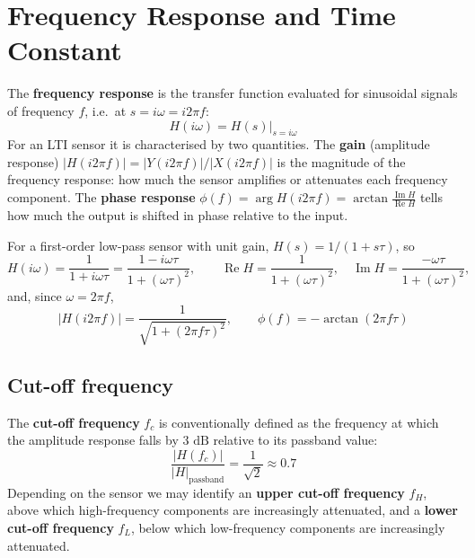 \documentclass[letterpaper,11pt,leqno]{book}
\begin{document}
\section{Frequency Response and Time Constant}
\label{sec:frequency_response}

The \textbf{frequency response} is the transfer function evaluated for sinusoidal signals of frequency $f$, i.e.\ at $s = i\omega = i2\pi f$:
\begin{equation}
\boxed{H(i\omega) = H(s)\big|_{s = i\omega}}
\label{eq:freq_resp_sub}
\end{equation}
For an LTI sensor it is characterised by two quantities. The \textbf{gain} (amplitude response) $|H(i2\pi f)| = |Y(i2\pi f)|/|X(i2\pi f)|$ is the magnitude of the frequency response: how much the sensor amplifies or attenuates each frequency component. The \textbf{phase response} $\phi(f) = \arg H(i2\pi f) = \arctan\frac{\operatorname{Im}H}{\operatorname{Re}H}$ tells how much the output is shifted in phase relative to the input.

For a first-order low-pass sensor with unit gain, $H(s) = 1/(1 + s\tau)$, so
\begin{equation}
H(i\omega) = \frac{1}{1 + i\omega\tau} = \frac{1 - i\omega\tau}{1 + (\omega\tau)^2}, \qquad \operatorname{Re}H = \frac{1}{1 + (\omega\tau)^2}, \quad \operatorname{Im}H = \frac{-\omega\tau}{1 + (\omega\tau)^2},
\label{eq:freq_resp_first_order_complex}
\end{equation}
and, since $\omega = 2\pi f$,
\begin{equation}
\boxed{|H(i2\pi f)| = \frac{1}{\sqrt{1 + (2\pi f\tau)^2}}, \qquad \phi(f) = -\arctan(2\pi f\tau)}
\label{eq:magnitude_and_phase_first_order}
\end{equation}

\subsection{Cut-off frequency}

The \textbf{cut-off frequency} $f_c$ is conventionally defined as the frequency at which the amplitude response falls by $3\text{ dB}$ relative to its passband value:
\begin{equation}
\boxed{\frac{|H(f_c)|}{|H|_{\text{passband}}} = \frac{1}{\sqrt{2}} \approx 0.7}
\label{eq:cutoff_magnitude}
\end{equation}
Depending on the sensor we may identify an \textbf{upper cut-off frequency} $f_H$, above which high-frequency components are increasingly attenuated, and a \textbf{lower cut-off frequency} $f_L$, below which low-frequency components are increasingly attenuated.
\end{document}
